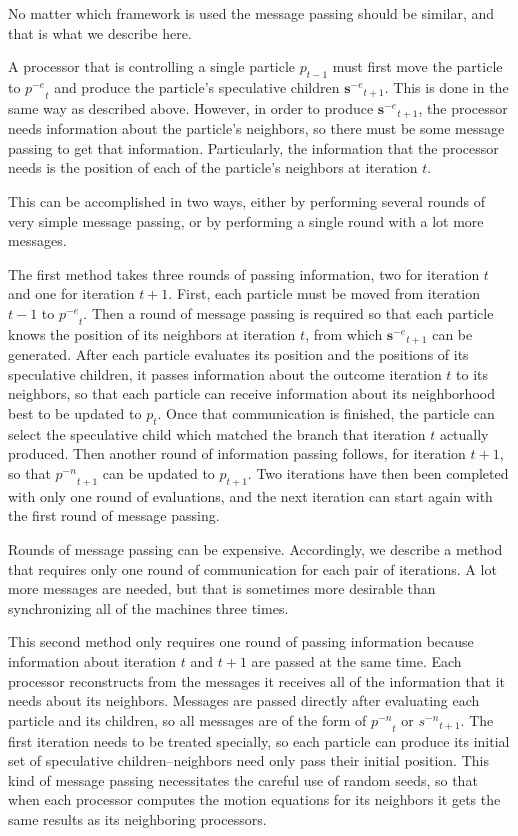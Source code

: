\documentclass[conference,letterpaper]{IEEEtran}
\providecommand{\noeval}[1]{\ensuremath{#1^{-e}}}
\providecommand{\nonbest}[1]{\ensuremath{#1^{-n}}}
\providecommand{\p}{\ensuremath{p}}
\providecommand{\s}{\ensuremath{s}}
\providecommand{\sset}{\ensuremath{\mathbf{s}}}
\begin{document}
No matter which framework is used the message passing should be similar, and
that is what we describe here.

A processor that is controlling a single particle $\p_{t-1}$ must first move
the particle to $\noeval{\p}_t$ and produce the particle's speculative children
$\noeval{\sset}_{t+1}$.  This is done in the same way as described above.
However, in order to produce $\noeval{\sset}_{t+1}$, the processor needs
information about the particle's neighbors, so there must be some message
passing to get that information.  Particularly, the information that the
processor needs is the position of each of the particle's neighbors at
iteration $t$.

This can be accomplished in two ways, either by performing several rounds of
very simple message passing, or by performing a single round with a lot more
messages.

The first method takes three rounds of passing information, two for iteration
$t$ and one for iteration $t+1$.  First, each particle must be moved from
iteration $t-1$ to $\noeval{\p}_t$.  Then a round of message passing is
required so that each particle knows the position of its neighbors at iteration
$t$, from which $\noeval{\sset}_{t+1}$ can be generated.  After each particle
evaluates its position and the positions of its speculative children, it passes
information about the outcome iteration $t$ to its neighbors, so that each
particle can receive information about its neighborhood best to be updated to
$\p_t$.  Once that communication is finished, the particle can select the
speculative child which matched the branch that iteration $t$ actually
produced.  Then another round of information passing follows, for iteration
$t+1$, so that $\nonbest{\p}_{t+1}$ can be updated to $\p_{t+1}$.  Two
iterations have then been completed with only one round of evaluations, and the
next iteration can start again with the first round of message passing.

Rounds of message passing can be expensive.  Accordingly, we describe a method
that requires only one round of communication for each pair of iterations.  A
lot more messages are needed, but that is sometimes more desirable than
synchronizing all of the machines three times.

This second method only requires one round of passing information because
information about iteration $t$ and $t+1$ are passed at the same time.  Each
processor reconstructs from the messages it receives all of the information
that it needs about its neighbors.  Messages are passed directly after
evaluating each particle and its children, so all messages are of the form of
$\nonbest{\p}_t$ or $\nonbest{\s}_{t+1}$.  The first iteration needs to be
treated specially, so each particle can produce its initial set of speculative
children--neighbors need only pass their initial position.  This kind of
message passing necessitates the careful use of random seeds, so that when each
processor computes the motion equations for its neighbors it gets the same
results as its neighboring processors.
\end{document}
